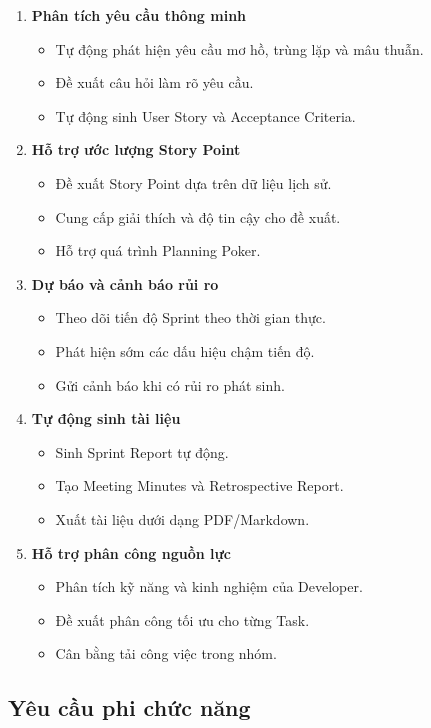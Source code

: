 \documentclass[12pt,a4paper]{report}
\begin{document}
\begin{enumerate}
\item \textbf{Phân tích yêu cầu thông minh}
\begin{itemize}
\item Tự động phát hiện yêu cầu mơ hồ, trùng lặp và mâu thuẫn.
\item Đề xuất câu hỏi làm rõ yêu cầu.
\item Tự động sinh User Story và Acceptance Criteria.
\end{itemize}

\item \textbf{Hỗ trợ ước lượng Story Point}
\begin{itemize}
\item Đề xuất Story Point dựa trên dữ liệu lịch sử.
\item Cung cấp giải thích và độ tin cậy cho đề xuất.
\item Hỗ trợ quá trình Planning Poker.
\end{itemize}

\item \textbf{Dự báo và cảnh báo rủi ro}
\begin{itemize}
\item Theo dõi tiến độ Sprint theo thời gian thực.
\item Phát hiện sớm các dấu hiệu chậm tiến độ.
\item Gửi cảnh báo khi có rủi ro phát sinh.
\end{itemize}

\item \textbf{Tự động sinh tài liệu}
\begin{itemize}
\item Sinh Sprint Report tự động.
\item Tạo Meeting Minutes và Retrospective Report.
\item Xuất tài liệu dưới dạng PDF/Markdown.
\end{itemize}

\item \textbf{Hỗ trợ phân công nguồn lực}
\begin{itemize}
\item Phân tích kỹ năng và kinh nghiệm của Developer.
\item Đề xuất phân công tối ưu cho từng Task.
\item Cân bằng tải công việc trong nhóm.
\end{itemize}
\end{enumerate}

\subsection{Yêu cầu phi chức năng}
\end{document}

